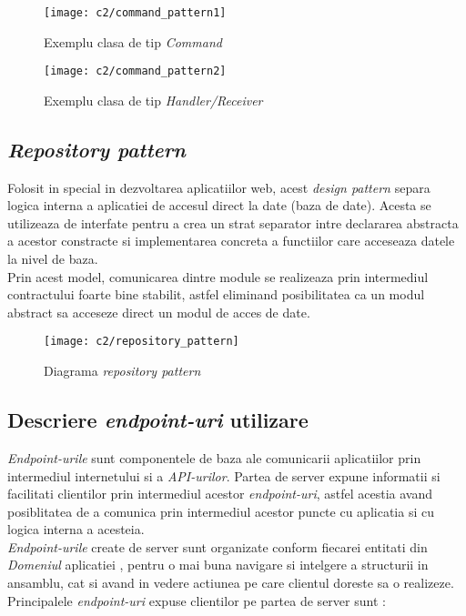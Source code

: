 \vspace{1cm}
\begin{figure}[h]
	\centering
	
	\texttt{[image: c2/command\_pattern1]}
	\caption{Exemplu clasa de tip \textit{Command}}
\end{figure}



\vspace{1cm}
\begin{figure}[h]
	\centering
	
	\texttt{[image: c2/command\_pattern2]}
	\caption{Exemplu clasa de tip \textit{Handler/Receiver}}
\end{figure}


\subsection*{\textit{Repository pattern}}

Folosit in special in dezvoltarea aplicatiilor web, acest \textit{design pattern} separa logica interna a aplicatiei de accesul direct la date (baza de date). Acesta se utilizeaza de interfate pentru a crea un strat separator intre declararea abstracta a acestor constracte si implementarea concreta a functiilor care acceseaza datele la nivel de baza.\\
Prin acest model, comunicarea dintre module se realizeaza prin intermediul contractului foarte bine stabilit, astfel eliminand posibilitatea ca un modul abstract sa acceseze direct un modul de acces de date.\\


\vspace{1cm}
\begin{figure}[h]
	\centering
	
	\texttt{[image: c2/repository\_pattern]}
	\caption{Diagrama \textit{repository pattern}}
\end{figure}
\subsection*{Descriere \textit{endpoint-uri} utilizare}
\textit{Endpoint-urile} sunt componentele de baza ale comunicarii aplicatiilor prin intermediul internetului si a \textit{API-urilor}. Partea de server expune informatii si facilitati clientilor prin intermediul acestor \textit{endpoint-uri}, astfel acestia avand posiblitatea de a comunica prin intermediul acestor puncte cu aplicatia si cu logica interna a acesteia.\\
\textit{Endpoint-urile} create de server sunt organizate conform fiecarei entitati din \textit{Domeniul} aplicatiei , pentru o mai buna navigare si intelgere a structurii in ansamblu, cat si avand in vedere actiunea pe care clientul doreste sa o realizeze.\\
Principalele \textit{endpoint-uri} expuse clientilor pe partea de server sunt :

